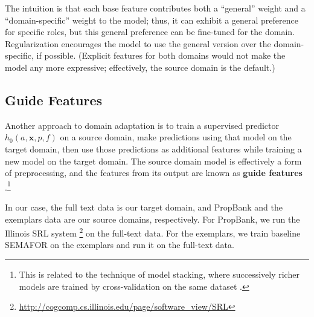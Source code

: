 \documentclass[11pt,a4paper]{article}
\newcommand{\exemplars}{\mathrm{ex}}
\newcommand{\fulltext}{\mathrm{ft}}
\newcommand{\ensuretext}[1]{#1}
\newcommand{\mkmarker}{\ensuretext{\textcolor{red}{\ensuremath{^{\textsc{M}}_{\textsc{K}}}}}}
\newcommand{\nasmarker}{\ensuretext{\textcolor{blue}{\ensuremath{^{\textsc{NA}}_{\textsc{S}}}}}}
\newcommand{\arkcomment}[3]{\ensuretext{\textcolor{#3}{[#1 #2]}}}
\newcommand{\mk}[1]{\arkcomment{\mkmarker}{#1}{red}}
\newcommand{\nascomment}[1]{\arkcomment{\nasmarker}{#1}{blue}}
\begin{document}
%
The intuition is that each base feature contributes both a ``general'' weight and a ``domain-specific'' weight 
to the model; thus, it can exhibit a general preference for specific roles,  
but this general preference can be fine-tuned for the domain.
Regularization encourages the model to use the general version over the domain-specific, if possible.
(Explicit features for both domains would not make the model any more expressive; 
effectively, the source domain is the default.)

\subsection{Guide Features}
\label{sec:guide}

Another approach to domain adaptation %
is to train a supervised predictor $h_0(a,\mathbf{x},p,f)$ on a source domain, make predictions using that
model on the target domain, then use those predictions as additional features
while training a new model on the target domain.
The source domain model is effectively a form of preprocessing, and the features from its output are known as \textbf{guide features} \citep{johansson-13,kong-14}.\footnote{This is related to the technique
of model stacking, where successively richer models are trained by cross-validation on the same dataset 
\citep[e.g.,][]{cohen-05,nivre-08,martins-08}.}

In our case, the full text data is our target domain, and PropBank and the
exemplars data are our source domains, respectively.
For PropBank, we run the Illinois SRL system
 \citep{punyakanok-08}\footnote{\url{http://cogcomp.cs.illinois.edu/page/software_view/SRL}}
 on the full-text data.
For the exemplars, we train baseline SEMAFOR on the exemplars and run it on the
full-text data.
\end{document}
